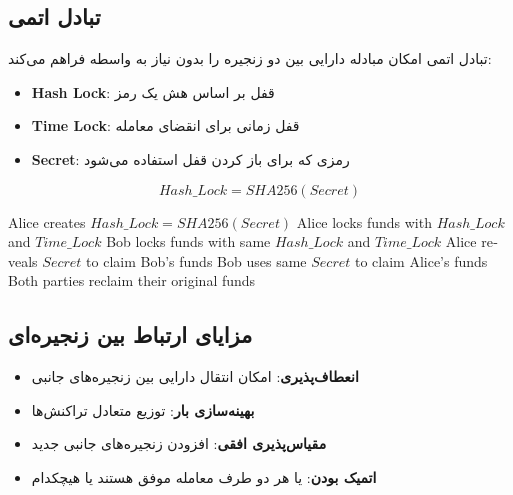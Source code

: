 \subsection{تبادل اتمی }

تبادل اتمی امکان مبادله دارایی بین دو زنجیره را بدون نیاز به واسطه فراهم می‌کند:

\begin{itemize}
    \item \textbf{Hash Lock}: قفل بر اساس هش یک رمز
    \item \textbf{Time Lock}: قفل زمانی برای انقضای معامله
    \item \textbf{Secret}: رمزی که برای باز کردن قفل استفاده می‌شود
\end{itemize}

\begin{latin}
\begin{equation}
Hash\_Lock = SHA256(Secret)
\end{equation}
\end{latin}

\begin{latin}
\begin{algorithm}[H]
\caption{Atomic Swap Protocol}
\begin{algorithmic}[1]
\STATE Alice creates $Hash\_Lock = SHA256(Secret)$
\STATE Alice locks funds with $Hash\_Lock$ and $Time\_Lock$
\STATE Bob locks funds with same $Hash\_Lock$ and $Time\_Lock$
\STATE Alice reveals $Secret$ to claim Bob's funds
\STATE Bob uses same $Secret$ to claim Alice's funds
    \STATE Both parties reclaim their original funds
\ENDIF
\end{algorithmic}
\end{algorithm}
\end{latin}

\subsection{مزایای ارتباط بین زنجیره‌ای}

\begin{itemize}
    \item \textbf{انعطاف‌پذیری}: امکان انتقال دارایی بین زنجیره‌های جانبی
    \item \textbf{بهینه‌سازی بار}: توزیع متعادل تراکنش‌ها
    \item \textbf{مقیاس‌پذیری افقی}: افزودن زنجیره‌های جانبی جدید
    \item \textbf{اتمیک بودن}: یا هر دو طرف معامله موفق هستند یا هیچکدام
\end{itemize}

